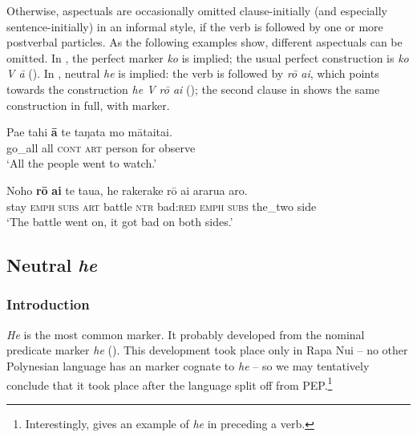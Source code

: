 Otherwise, aspectuals are occasionally omitted clause-initially (and especially sen\-tence-initially) in an informal style, if the verb is followed by one or more postverbal particles. As the following examples show, different aspectuals can be omitted. In , the perfect  marker \textit{ko} is implied; the usual perfect  construction is \textit{ko V {\ꞌ}ā} (). In , neutral \textit{he} is implied: the verb is followed by \textit{rō {\ꞌ}ai}, which points towards the construction \textit{he V rō {\ꞌ}ai} (); the second clause in  shows the same construction in full, with  marker. 

\ea\label{ex:7.1}
\gll Pae tahi \textbf{{\ꞌ}ā} te taŋata mo māta{\ꞌ}ita{\ꞌ}i. \\
go\_all all \textsc{cont} \textsc{art} person for observe \\

\glt 
‘All the people went to watch.’ \textstyleExampleref{[R415.785]} 
\z

\ea\label{ex:7.2}
\gll Noho \textbf{rō} \textbf{{\ꞌ}ai} te tau{\ꞌ}a, he rakerake rō {\ꞌ}ai ararua {\ꞌ}aro. \\
stay \textsc{emph} \textsc{subs} \textsc{art} battle \textsc{ntr} bad:\textsc{red} \textsc{emph} \textsc{subs} the\_two side \\

\glt 
‘The battle went on, it got bad on both sides.’ \textstyleExampleref{[R104.074]} 
\z

\subsection{Neutral \textit{he}}\label{sec:7.2.3}
\subsubsection{Introduction}\label{sec:7.2.3.1}

\textit{He} is the most common  marker. It probably developed from the nominal predicate marker \textit{he} (). This development took place only in Rapa Nui – no other Polynesian language has an  marker cognate to \textit{he} – so we may tentatively conclude that it took place after the language split off from PEP.\footnote{\label{fn:311}Interestingly, \citet[57]{Cook1999} gives an example of \textit{he} in  preceding a verb.} 

